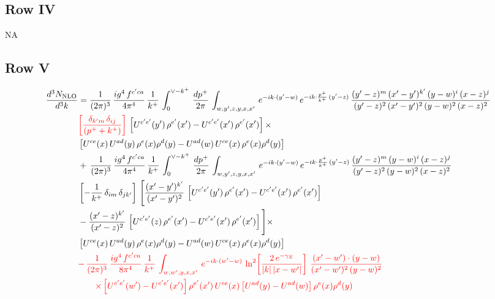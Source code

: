 \documentclass[9pt]{article}
\numberwithin{equation}{section}
\newcommand{\chg}[1]{{\color{red}#1}}
\begin{document}
\subsection{Row IV}
\textsc{NA}
\subsection{Row V}
\begin{align}
    \frac{d^{3}N_{\rm NLO}}{d^{3}k} & =  \frac{1}{(2\pi)^{3}}\, \frac{ig^{4}\,f^{c'ca}}{4\pi^{4}}\, \frac{1}{k^{+}}\,\int_{0}^{\vee-k^{+}}\, \frac{dp^{+}}{2\pi}\, \int_{w,y',z,y,x,x'}\, e^{-ik\cdot (y'-w)}\, e^{-ik\cdot \frac{p^{+}}{k^{+}}\,(y'-z)}\,\frac{(y'-z)^{m}\,(x'-y')^{k'}\,(y-w)^{i}\,(x-z)^{j}}{(y'-z)^{2}\,(x'-y')^{2}\,(y-w)^{2}\,(x-z)^{2}}\notag \\ & \chg{\left[\frac{\delta_{k'm}\,\delta_{ij}}{(p^{+}+k^{+})}\right]}\, \left[U^{c'e'}(y')\,\rho^{e'}(x')-U^{c'e'}(x')\,\rho^{e'}(x')\right]\times \notag \\ &  \left[U^{ce}(x)\,U^{ad}(y)\,\rho^{e}(x)\rho^{d}(y)-U^{ad}(w)\,U^{ce}(x)\,\rho^{e}(x)\rho^{d}(y)\right] \notag \\
&   +\,\frac{1}{(2\pi)^{3}}\, \frac{ig^{4}\,f^{c'ca}}{4\pi^{4}}\, \frac{1}{k^{+}}\,\int_{0}^{\vee-k^{+}}\, \frac{dp^{+}}{2\pi}\, \int_{w,y',z,y,x,x'}\, e^{-ik\cdot (y'-w)}\, e^{-ik\cdot \frac{p^{+}}{k^{+}}\,(y'-z)}\,\frac{(y'-z)^{m}\,(y-w)^{i}\,(x-z)^{j}}{(y'-z)^{2}\,(y-w)^{2}\,(x-z)^{2}}\notag \\ &   \left[-\frac{1}{k^{+}}\, \delta_{im}\, \delta_{jk'}\right]\, \Bigg[\frac{(x'-y')^{k'}}{(x'-y')^{2}}\,\left[U^{c'e'}(y')\,\rho^{e'}(x')-U^{c'e'}(x')\,\rho^{e'}(x')\right]\notag \\ & -\frac{(x'-z)^{k'}}{(x'-z)^{2}}\,\left[U^{c'e'}(z)\,\rho^{e'}(x')-U^{c'e'}(x')\,\rho^{e'}(x')\right]\Bigg]\times \notag \\ &    \left[U^{ce}(x)\,U^{ad}(y)\,\rho^{e}(x)\rho^{d}(y)-U^{ad}(w)\,U^{ce}(x)\,\rho^{e}(x)\rho^{d}(y)\right] \notag \\
& \chg{-\,\frac{1}{(2\pi)^{3}}\, \frac{ig^{4}\,f^{c'ca}}{8\pi^{4}}\, \frac{1}{k^{+}}\,\int_{w,w',y,x,x'}\, e^{-ik\cdot (w'-w)}\,\ln^{2}\!\left[\frac{2\,e^{-\gamma_{E}}}{|k|\,|x-w'|}\right]\,\frac{(x'-w')\cdot (y-w)}{(x'-w')^{2}\,(y-w)^{2}}}\notag \\ & \chg{\qquad\times\left[U^{c'e'}(w')-U^{c'e'}(x')\right]\rho^{e'}(x')\,U^{ce}(x)\left[U^{ad}(y)-U^{ad}(w)\right]\rho^{e}(x)\rho^{d}(y)}
\end{align}
\end{document}
